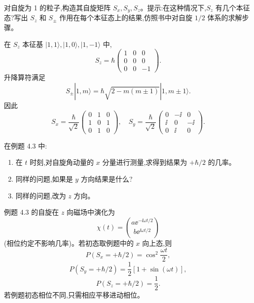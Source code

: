 \begin{question}
对自旋为 1 的粒子,构造其自旋矩阵 $S_x,S_y,S_z$。提示:在这种情况下,$S_z$ 有几个本征态?写出 $S_z$ 和 $S_\pm$ 作用在每个本征态上的结果,仿照书中对自旋 $1/2$ 体系的求解步骤。
\begin{solution}

在 $S_z$ 本征基 $|1,1\rangle,|1,0\rangle,|1,-1\rangle$ 中,
\[
S_z=\hbar\begin{pmatrix}1&0&0\\0&0&0\\0&0&-1\end{pmatrix}.
\]
升降算符满足
\[
S_\pm|1,m\rangle=\hbar\sqrt{2-m(m\pm1)}|1,m\pm1\rangle.
\]
因此
\[
S_x=\frac\hbar{\sqrt2}\begin{pmatrix}0&1&0\\1&0&1\\0&1&0\end{pmatrix},
\quad
S_y=\frac\hbar{\sqrt2}\begin{pmatrix}0&-\ii&0\\\ii&0&-\ii\\0&\ii&0\end{pmatrix}.
\]

\end{solution}
\end{question}

\begin{question}
在例题 4.3 中:
\begin{enumerate}
\item 在 $t$ 时刻,对自旋角动量的 $x$ 分量进行测量,求得到结果为 $+\hbar/2$ 的几率。
\item 同样的问题,如果是 $y$ 方向结果是什么?
\item 同样的问题,改为 $z$ 方向。
\end{enumerate}
\begin{solution}

例题 4.3 的自旋在 $z$ 向磁场中演化为
\[
\chi(t)=\binom{a \ee^{-\ii\omega t/2}}{b \ee^{\ii\omega t/2}}
\]
(相位约定不影响几率)。若初态取例题中的 $x$ 向上态,则
\[
P(S_x=+\hbar/2)=\cos^2\frac{\omega t}{2},
\]
\[
P(S_y=+\hbar/2)=\frac12[1+\sin(\omega t)],
\]
\[
P(S_z=+\hbar/2)=\frac12.
\]
若例题初态相位不同,只需相应平移进动相位。

\end{solution}
\end{question}

